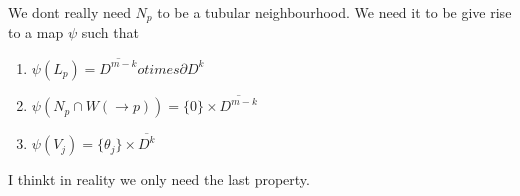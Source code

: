 \begin{comment}[Müll]
	$$\left(\frac{\partial}{\partial \tilde{x} ^i}\right)_i$$
	corresponding to the new chart $\psi\circ L: U\to V\subseteq \R^m$ reads for any $f_p\in \mathcal{E}_p(M)$:
	\begin{align*}
		\frac{\partial}{\partial \tilde{x} ^j}(f_p)
		& =\frac{\partial}{\partial x^j} \Big|_{0}(f\circ\psi^{-1}\circ L^{-1}) \\
		&= \sum _k \frac{\partial f\circ \psi^{-1}}{\partial x^k}(L^{-1}(0))\frac{\partial (L^{-1})_k}{\partial x^j}(0)\\
		&= \sum _k \underbrace{\frac{\partial f\circ \psi^{-1}}{\partial x^k}(0)}_{=\frac{\partial}{\partial x^k}(f_p)}  \underbrace{\frac{\partial (L^{-1})_k}{\partial x^j}(0)}_{=\lambda^k_j}\\
		& =\left(\sum_k \lambda^k_j(\frac{\partial}{\partial x^k})\right)(f_p)=b_j(f_p) \, .
	\end{align*} Hence, a linear change of koordinates lets us manipulate any chart such that the basis of the tangendspaces in the origin of the given chart is orthongonal (or even orthonormal) with resprect to a given metric.
	
	
	Now this is somewhat troublesome:
	We could now choose a basis, such that $\frac{\partial}{\partial x}\grad(f)$ is diagonal and hence the exponential is easy to calculate. But then we dont know how $f$ looks like. But with a Morse chart (where we controle $f$) we have trouble calculating the exponential of $\frac{\partial}{\partial x}\grad(f)$. The hope ist that there is a change of basis that keeps the splitting.
	
	
	
	We calculate $ g(p)\left( \frac{\partial}{\partial x_i}\big|_p, \frac{\partial}{\partial x_j}\big|_p\right)$. With the coordinate map we have that $g(p)\left(q_{\psi\circ L^{-1}}^{-1},q_{\psi\circ L^{-1}}^{-1}\right)$ is a quadratic form on $R^n$ and given by a matrix $\tilde{G}$. \todo{Check how $\tilde{G}$ and $G$ are connected, by analysing how $q_{\psi\circ L^{-1}}$ and $q_{\psi}$ are connected}
	
	
\end{comment}
\begin{lemma}
	We dont really need $N_p$ to be a tubular neighbourhood. We need it to be give rise to a map $\psi$ such that 
	\begin{enumerate}
		\item $\psi(L_p)=\overline{D^{m-k}}otimes \partial D^k$
		\item $\psi(N_p\cap W(\to p))=\{0\}\times \overline{D^{m-k}}$
		\item $\psi(V_j)=\{\theta_j\}\times \overline{D^k}$ 
	\end{enumerate} I thinkt in reality we only need the last property.
\end{lemma}
